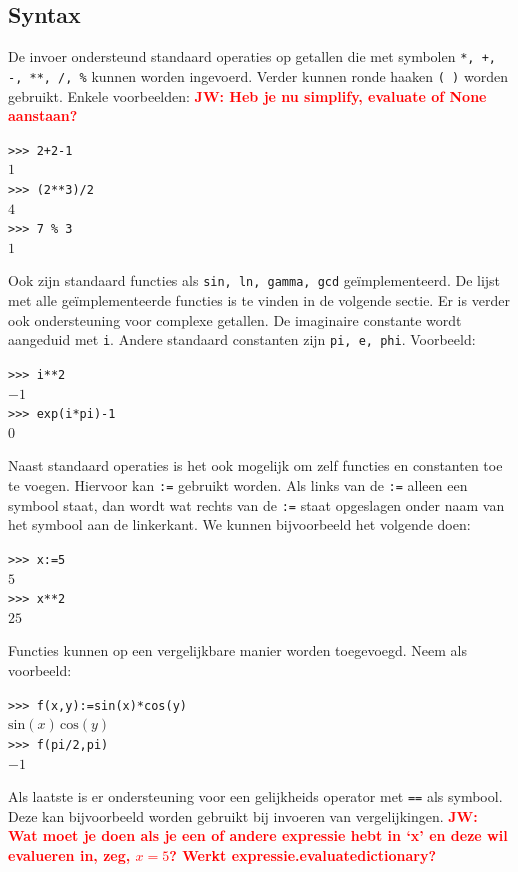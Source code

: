 \documentclass[a4paper]{article}
\newcommand{\rcom}[1]{\textbf{\textcolor{red}{#1}}}
\begin{document}
\subsection{Syntax}
De invoer ondersteund standaard operaties op getallen die met symbolen \texttt{*, +, -, **, /, \%} kunnen worden ingevoerd. Verder kunnen ronde haaken \texttt{( )} worden gebruikt. Enkele voorbeelden: \rcom{JW: Heb je nu simplify, evaluate of None aanstaan?}
\begin{adjustwidth}{1.5cm}{}
\texttt{>>> 2+2-1}\\
$1$\\
\texttt{>>> (2**3)/2}\\
$4$\\
\texttt{>>> 7 \% 3}\\
$1$
\end{adjustwidth}
Ook zijn standaard functies als \texttt{sin, ln, gamma, gcd} ge\"implementeerd. %
De lijst met alle ge\"implementeerde functies is te vinden in de volgende sectie. Er is verder ook ondersteuning voor complexe getallen. De imaginaire constante wordt aangeduid met \texttt{i}. Andere standaard constanten zijn \texttt{pi, e, phi}. Voorbeeld:
\begin{adjustwidth}{1.5cm}{}
\texttt{>>> i**2}\\
$-1$\\
\texttt{>>> exp(i*pi)-1}\\
$0$
\end{adjustwidth}
Naast standaard operaties is het ook mogelijk om zelf functies en constanten toe te voegen. Hiervoor kan \texttt{:=} gebruikt worden. Als links van de \texttt{:=} alleen een symbool staat, dan wordt wat rechts van de \texttt{:=} staat opgeslagen onder naam van het symbool aan de linkerkant. We kunnen bijvoorbeeld het volgende doen:
\begin{adjustwidth}{1.5cm}{}
\texttt{>>> x:=5}\\
$5$\\
\texttt{>>> x**2}\\
$25$
\end{adjustwidth}
Functies kunnen op een vergelijkbare manier worden toegevoegd. Neem als voorbeeld:
\begin{adjustwidth}{1.5cm}{}
\texttt{>>> f(x,y):=sin(x)*cos(y)}\\
$\mathrm{sin}(x)\,\mathrm{cos}(y)$\\
\texttt{>>> f(pi/2,pi)}\\
$-1$
\end{adjustwidth}
Als laatste is er ondersteuning voor een gelijkheids operator met \texttt{==} als symbool. Deze kan bijvoorbeeld worden gebruikt bij invoeren van vergelijkingen. \rcom{JW: Wat moet je doen als je een of andere expressie hebt in `x' en deze wil evalueren in, zeg, $x=5$? Werkt expressie.evaluate{dictionary}?}	
\end{document}

